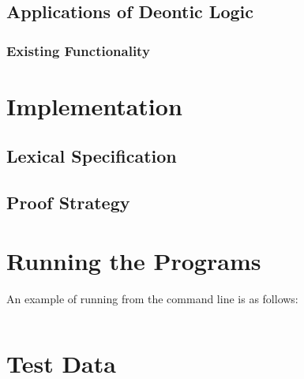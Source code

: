 \documentclass{l4proj}
\begin{document}
\section{Applications of Deontic Logic}

\subsection{Existing Functionality}

\chapter{Implementation}

\section{Lexical Specification}

\section{Proof Strategy}


\begin{appendices}

\chapter{Running the Programs}
An example of running from the command line is as follows:
\begin{verbatim}
\end{verbatim}

\chapter{Test Data}

\end{appendices}




\end{document}
